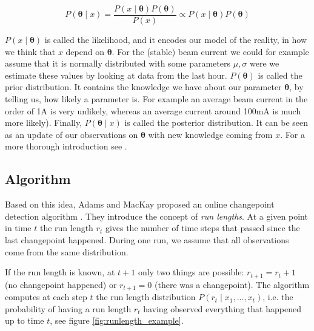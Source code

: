 \documentclass[12pt,a4paper]{article}
\begin{document}
\begin{equation} \label{eq:posterior_distribution}
	P\left(\bm {{\theta}} \mid x\right)=\frac{P\left(x \mid \bm{{\theta}}\right)P\left(\bm {{\theta}}\right)}{P\left(x\right)} \propto P\left(x \mid \bm{{\theta}}\right)P\left(\bm {{\theta}}\right)
\end{equation}

$P\left(x \mid \bm{{\theta}}\right)$ is called the likelihood, and it encodes our model of the reality, in how we think that $x$ depend on $\bm{{\theta}}$. For the (stable) beam current we could for example assume that it is normally distributed with some parameters $\mu, \sigma$ were we estimate these values by looking at data from the last hour. $P\left(\bm {{\theta}}\right)$ is called the prior distribution. It contains the knowledge we have about our parameter $\bm{{\theta}}$, by telling us, how likely a parameter is. For example an average beam current in the order of 1A is very unlikely, whereas an average current around 100mA is much more likely).  Finally, $P\left(\bm {{\theta}} \mid x\right)$ is called the posterior distribution. It can be seen as an update of our observations on $\bm{{\theta}}$ with new knowledge coming from $x$. For a more thorough introduction see \cite{Spiegelhalter:Bayesianstatistics,Brooks-Bartlett:Probabilityconceptsexplained}.

\subsection{Algorithm}

Based on this idea, Adams and MacKay proposed an online changepoint detection algorithm \cite{Adams:BayesianOnlineChangepoint}. They introduce the concept of \textit{run lengths}. At a given point in time $t$ the run length $r_t$ gives the number of time steps that passed since the last changepoint happened. During one run, we assume that all observations come from the same distribution.

If the run length is known, at $t+1$ only two things are possible: $r_{t+1}=r_t + 1$ (no changepoint happened) or $r_{t+1}=0$ (there was a changepoint). The algorithm computes at each step $t$ the run length distribution $P(r_t \mid x_1,\dots,x_t)$, i.e. the probability of having a run length $r_t$ having observed everything that happened up to time $t$, see figure \ref{fig:runlength_example}.
\end{document}
